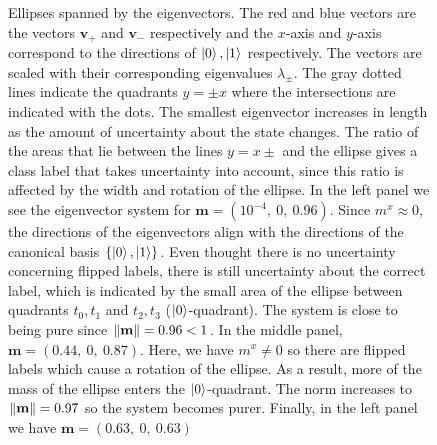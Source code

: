 \clearpage

\begin{figure}[htb!]
    \centering

    \caption{Ellipses spanned by the eigenvectors. The red and blue vectors are the vectors $\mathbf{v_+}$ and $\mathbf{v}_-$ respectively and the $x$-axis and $y$-axis correspond to the directions of $\ket{0}, \ket{1}$ respectively. The vectors are scaled with their corresponding eigenvalues $\lambda_\pm$. The gray dotted lines indicate the quadrants $y=\pm x$ where the intersections are indicated with the dots. The smallest eigenvector increases in length as the amount of uncertainty about the state changes. The ratio of the areas that lie between the lines $y=x\pm$ and the ellipse gives a class label that takes uncertainty into account, since this ratio is affected by the width and rotation of the ellipse. In the left panel we see the eigenvector system for $\mathbf{m} = (10^{-4},\: 0 ,\: 0.96)$. Since $m^x\approx0$, the directions of the eigenvectors align with the directions of the canonical basis $\{\ket{0}, \ket{1}\}$. Even thought there is no uncertainty concerning flipped labels, there is still uncertainty about the correct label, which is indicated by the small area of the ellipse between quadrants $t_0,t_1$ and $t_2, t_3$ ($\ket{0}$-quadrant). The system is close to being pure since $\norm{\mathbf{m}}=0.96<1$. In the middle panel, $\mathbf{m} = (0.44,\: 0,\: 0.87)$. Here, we have $m^x\neq0$ so there are flipped labels which cause a rotation of the ellipse. As a result, more of the mass of the ellipse enters the $\ket{0}$-quadrant. The norm increases to $\norm{\mathbf{m}}=0.97$ so the system becomes purer. Finally, in the left panel we have $\mathbf{m} = (0.63,\: 0 ,\: 0.63)$
    }
    \label{fig:ellipse_1}
\end{figure}

